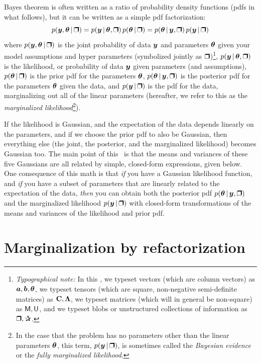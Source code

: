 Bayes theorem is often written as a ratio of probability density
functions (pdfs in what follows), but it can be written as a simple
pdf factorization:
\begin{equation}
p(\vy,\vtheta\given\bH) = p(\vy\given\vtheta,\bH)\,p(\vtheta\given\bH) = p(\vtheta\given\vy,\bH)\,p(\vy\given\bH)
\end{equation}
where
$p(\vy,\vtheta\given\bH)$ is the joint probability of data $\boldsymbol{y}$ and
parameters $\boldsymbol{\theta}$ given your model assumptions and hyper parameters
(symbolized jointly as $\bH$)\footnote{%
\textsl{Typographical note:} In this \documentname, we
typeset vectors (which are column vectors) as $\boldsymbol{a}, \boldsymbol{b}, \boldsymbol{\theta}$, we typeset tensors (which
are square, non-negative semi-definite matrices) as $\mathbf{C}, \mathbf{\Lambda}$,
we typeset matrices (which will in general be non-square) as $\mathsf{M}, \mathsf{U}$,
and we typeset blobs or unstructured
collections of information as $\bH, \bP$.},
$p(\vy\given\vtheta,\bH)$ is the likelihood, or probability of data $\boldsymbol{y}$
given parameters (and assumptions),
$p(\vtheta\given\bH)$ is the prior pdf for the parameters $\boldsymbol{\theta}$,
$p(\vtheta\given\vy,\bH)$ is the posterior pdf for the parameters $\boldsymbol{\theta}$
given the data,
and
$p(\vy\given\bH)$ is the pdf for the data, marginalizing out all of the linear
parameters (hereafter, we refer to this as the \textsl{marginalized
likelihood}\footnote{In the case that the problem has no parameters other than
the linear parameters $\boldsymbol{\theta}$, this term, $p(\vy \given \bH)$, is sometimes
called the \textsl{Bayesian evidence} or the \textsl{fully marginalized
likelihood}.}).

If the likelihood is Gaussian, and the expectation of the data depends linearly
on the parameters, and if we choose the prior pdf to also be Gaussian, then
everything else (the joint, the posterior, and the marginalized likelihood)
becomes Gaussian too.
The main point of this \documentname\ is that the means and variances of these
five Gaussians are all related by simple, closed-form expressions, given below.
One consequence of this math is that \emph{if} you have a Gaussian
likelihood function, and \emph{if} you have a subset of parameters that are
linearly related to the expectation of the data, \emph{then} you can obtain both
the posterior pdf $p(\vtheta\given\vy,\bH)$ and the marginalized likelihood
$p(\vy\given\bH)$ with closed-form transformations of the means and variances of
the likelihood and prior pdf.

\section{Marginalization by refactorization}

